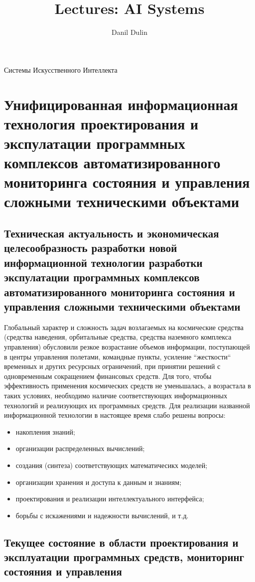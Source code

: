 \documentclass[a4paper,12pt]{report}
\begin{document}
\author{Danil Dulin}
\title{Lectures: AI Systems}

{\huge{Системы Искусственного Интеллекта}}

\tableofcontents

\newpage


\chapter{Унифицированная информационная технология проектирования и
	экспулатации программных комплексов автоматизированного мониторинга
	состояния и управления сложными техническими объектами}


\section{Техническая актуальность и экономическая целесообразность
	разработки новой информационной технологии разработки экспулатации
	программных комплексов автоматизированного мониторинга состояния и
	управления сложными техническими объектами}

	Глобальный характер и сложность задач возлагаемых на космические средства
	(средства наведения, орбитальные средства, средства наземного комплекса
	управления) обусловили резкое возрастание объемов информации, поступающей
	в центры управления полетами, командные пункты, усиление ``жесткости``
	 временных и других ресурсных ограничений, при принятии решений с
	одновременным сокращением финансовых средств. Для того, чтобы эффективность
	применения космических средств не уменьшалась, а возрастала в таких
	условиях, необходимо наличие соответствующих информационных технологий
	и реализующих их программных средств. Для реализации названной
	информационной технологии в настоящее время слабо решены вопросы:
	\begin{itemize}
		\item накопления знаний;
		\item организации распределенных вычислений;
		\item создания (синтеза) соответствующих математичесикх моделей;
		\item организации хранения и доступа к данным и знаниям;
		\item проектирования и реализации интеллектуального интерфейса;
		\item борьбы с искажениями и надежности вычислений, и т.д.
	\end{itemize}


\section{Текущее состояние в области проектирования и эксплуатации
	программных средств, мониторинг состояния и управления}
\end{document}
